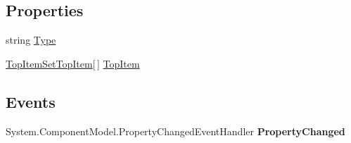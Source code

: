 \subsection*{Properties}
\begin{DoxyCompactItemize}
\item 
\hypertarget{class_price___comparison_1_1amazon_1_1ecs_1_1_top_item_set_ab68124a885d208a4b426d9a23cf0834d}{string \hyperlink{class_price___comparison_1_1amazon_1_1ecs_1_1_top_item_set_ab68124a885d208a4b426d9a23cf0834d}{Type}}\label{class_price___comparison_1_1amazon_1_1ecs_1_1_top_item_set_ab68124a885d208a4b426d9a23cf0834d}

\begin{DoxyCompactList}\small\item\em \end{DoxyCompactList}\item 
\hypertarget{class_price___comparison_1_1amazon_1_1ecs_1_1_top_item_set_ab7e0b3a5af3c2c7afa4f6a161e5737b2}{\hyperlink{class_price___comparison_1_1amazon_1_1ecs_1_1_top_item_set_top_item}{Top\-Item\-Set\-Top\-Item}\mbox{[}$\,$\mbox{]} \hyperlink{class_price___comparison_1_1amazon_1_1ecs_1_1_top_item_set_ab7e0b3a5af3c2c7afa4f6a161e5737b2}{Top\-Item}}\label{class_price___comparison_1_1amazon_1_1ecs_1_1_top_item_set_ab7e0b3a5af3c2c7afa4f6a161e5737b2}

\begin{DoxyCompactList}\small\item\em \end{DoxyCompactList}\end{DoxyCompactItemize}
\subsection*{Events}
\begin{DoxyCompactItemize}
\item 
\hypertarget{class_price___comparison_1_1amazon_1_1ecs_1_1_top_item_set_a3dc77d8a8ea1a55bc2da5828aa4bf41e}{System.\-Component\-Model.\-Property\-Changed\-Event\-Handler {\bfseries Property\-Changed}}\label{class_price___comparison_1_1amazon_1_1ecs_1_1_top_item_set_a3dc77d8a8ea1a55bc2da5828aa4bf41e}

\end{DoxyCompactItemize}
